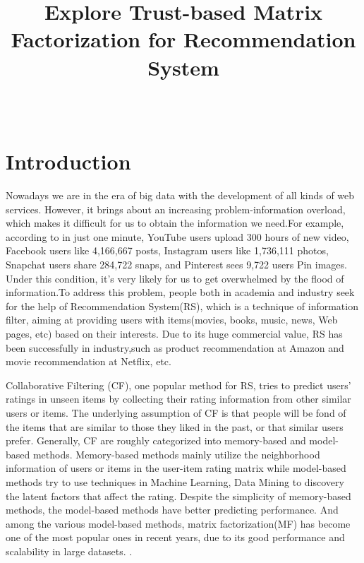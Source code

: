 \documentclass[10pt,onecolumn,conference]{IEEEtran}
\begin{document}
\title{Explore Trust-based Matrix Factorization for Recommendation System}
\author{\\
}

\maketitle

\IEEEpeerreviewmaketitle



\section{Introduction}
Nowadays we are in the era of big data with the development of all kinds of web services. However, it brings about an increasing problem-information overload, which makes it difficult for us to obtain the information we need.For example, according to \cite{stats_url} in just one minute, YouTube users upload 300 hours of new video, Facebook users like 4,166,667 posts, Instagram users like 1,736,111 photos, Snapchat users share 284,722 snaps, and Pinterest sees 9,722 users Pin images. Under this condition, it's very likely for us to get overwhelmed by the flood of information.To address this problem, people both in academia and industry seek for the help of Recommendation System(RS), which is a technique of information filter, aiming at providing users with items(movies, books, music, news, Web pages, etc) based on their interests. Due to its huge commercial value, RS has been successfully in industry,such as product recommendation at Amazon and movie recommendation at Netflix, etc. 

Collaborative Filtering (CF), one popular method for RS, tries to predict users' ratings in unseen items by collecting their rating information from other similar users or items. The underlying assumption of CF is that people will be fond of the items that are similar to those they liked in the past, or that similar users prefer. Generally, CF are roughly categorized into memory-based and model-based methods. Memory-based methods mainly utilize the neighborhood information of users or items in the user-item rating matrix while model-based methods try to use techniques in Machine Learning, Data Mining to discovery the latent factors that affect the rating. Despite the simplicity of memory-based methods, the model-based methods have better predicting performance. And among the various model-based methods, matrix factorization(MF) has become one of the most popular ones in recent years, due to its good performance and scalability in large datasets. \cite{koren2009matrix}\cite{mnih2007probabilistic}.
\end{document}

